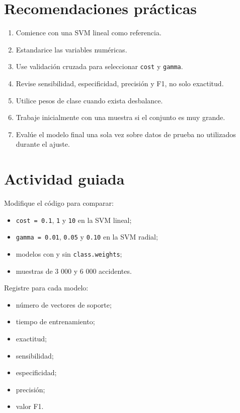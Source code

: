 \documentclass[
  spanish,
  10.5pt,
  letterpaper,
  openany,
  headings=big]{scrbook}
\providecommand{\tightlist}{%
  \setlength{\itemsep}{0pt}\setlength{\parskip}{0pt}}
\begin{document}
\section{Recomendaciones prácticas}\label{recomendaciones-pruxe1cticas}

\begin{enumerate}
\def\labelenumi{\arabic{enumi}.}
\tightlist
\item
  Comience con una SVM lineal como referencia.
\item
  Estandarice las variables numéricas.
\item
  Use validación cruzada para seleccionar \texttt{cost} y
  \texttt{gamma}.
\item
  Revise sensibilidad, especificidad, precisión y F1, no solo exactitud.
\item
  Utilice pesos de clase cuando exista desbalance.
\item
  Trabaje inicialmente con una muestra si el conjunto es muy grande.
\item
  Evalúe el modelo final una sola vez sobre datos de prueba no
  utilizados durante el ajuste.
\end{enumerate}

\section{Actividad guiada}\label{actividad-guiada-1}

Modifique el código para comparar:

\begin{itemize}
\tightlist
\item
  \texttt{cost\ =\ 0.1}, \texttt{1} y \texttt{10} en la SVM lineal;
\item
  \texttt{gamma\ =\ 0.01}, \texttt{0.05} y \texttt{0.10} en la SVM
  radial;
\item
  modelos con y sin \texttt{class.weights};
\item
  muestras de 3 000 y 6 000 accidentes.
\end{itemize}

Registre para cada modelo:

\begin{itemize}
\tightlist
\item
  número de vectores de soporte;
\item
  tiempo de entrenamiento;
\item
  exactitud;
\item
  sensibilidad;
\item
  especificidad;
\item
  precisión;
\item
  valor F1.
\end{itemize}
\end{document}
